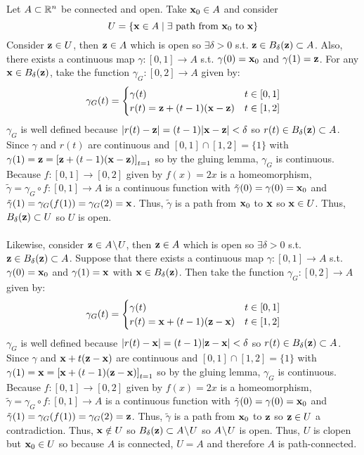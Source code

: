 \documentclass[12pt]{extarticle}
\begin{document}
Let $A \subset \R^n$ be connected and open. Take $\bf{x}_0 \in A$ and consider \[U = \{ \bf{x} \in A \mid \exists \text{ path from } \bf{x}_0 \text{ to } \bf{x} \}\] Consider $\bf{z} \in U$, then $\bf{z} \in A$ which is open so $\exists \delta > 0$ s.t. $\bf{z} \in \ball{\delta}{\bf{z}} \subset A$. Also, there exists a continuous map $\gamma : [0, 1] \to A$ s.t. $\gamma(0) = \bf{x}_0$ and $\gamma(1) = \bf{z}$. For any $\bf{x} \in \ball{\delta}{\bf{z}}$, take the function $\gamma_G : [0, 2] \to A$ given by: 
\[\gamma_G(t) = 
\begin{cases}
\gamma(t) & t \in [0,1] \\
r(t) = \bf{z} + (t - 1)(\bf{x} - \bf{z}) & t \in [1,2]
\end{cases}\]
$\gamma_G$ is well defined because $|r(t) - \bf{z}| = (t - 1) |\bf{x} - \bf{z}| < \delta$ so $r(t) \in \ball{\delta}{\bf{z}} \subset A$.
Since $\gamma$ and $r(t)$ are continuous and $[0, 1] \cap [1, 2] = \{1\}$ with $\gamma(1) = \bf{z} = \left[\bf{z} + (t - 1)(\bf{x} - \bf{z}) \right]_{t = 1}$ so by the gluing lemma, $\gamma_G$ is continuous. Because $f : [0, 1] \to [0,2]$ given by $f(x) = 2x$ is a homeomorphism, $\tilde{\gamma} = \gamma_G \circ f : [0, 1] \to A$ is a continuous function with $\tilde{\gamma}(0) = \gamma(0) = \bf{x}_0$ and $\tilde{\gamma}(1) = \gamma_G(f(1)) = \gamma_G(2) = \bf{x}$. Thus, $\tilde{\gamma}$ is a path from $\bf{x}_0$ to $\bf{x}$ so $\bf{x} \in U$. Thus, $\ball{\delta}{\bf{z}} \subset U$ so $U$ is open. \\ \\
 
Likewise, consider $\bf{z} \in A \sm U$, then $\bf{z} \in A$ which is open so $\exists \delta > 0$ s.t. $\bf{z} \in \ball{\delta}{\bf{z}} \subset A$. Suppose that there exists a continuous map $\gamma : [0, 1] \to A$ s.t. $\gamma(0) = \bf{x}_0$ and $\gamma(1) = \bf{x}$ with $\bf{x} \in \ball{\delta}{\bf{z}}$. Then take the function $\gamma_G : [0, 2] \to A$ given by: 
\[\gamma_G(t) = 
\begin{cases}
\gamma(t) & t \in [0,1] \\
r(t) = \bf{x} + (t - 1)(\bf{z} - \bf{x}) & t \in [1,2]
\end{cases}\]
$\gamma_G$ is well defined because $|r(t) - \bf{x}| = (t - 1) |\bf{z} - \bf{x}| < \delta$ so $r(t) \in \ball{\delta}{\bf{z}} \subset A$.
Since $\gamma$ and $\bf{x} + t(\bf{z} - \bf{x})$ are continuous and $[0, 1] \cap [1, 2] = \{1\}$ with $\gamma(1) = \bf{x} = \left[\bf{x} + (t - 1)(\bf{z} - \bf{x}) \right]_{t = 1}$ so by the gluing lemma, $\gamma_G$ is continuous. Because $f : [0, 1] \to [0,2]$ given by $f(x) = 2x$ is a homeomorphism, $\tilde{\gamma} = \gamma_G \circ f : [0, 1] \to A$ is a continuous function with $\tilde{\gamma}(0) = \gamma(0) = \bf{x}_0$ and $\tilde{\gamma}(1) = \gamma_G(f(1)) = \gamma_G(2) = \bf{z}$. Thus, $\tilde{\gamma}$ is a path from $\bf{x}_0$ to $\bf{z}$ so $\bf{z} \in U$ a contradiction. Thus, $\bf{x} \notin U$ so $\ball{\delta}{\bf{z}} \subset A \sm U$ so $A \sm U$ is open. Thus, $U$ is clopen but $\bf{x}_0 \in U$ so because $A$ is connected, $U = A$ and therefore $A$ is path-connected.
\end{document}
